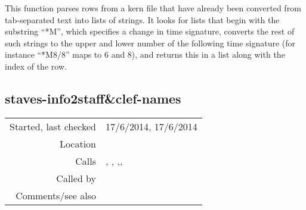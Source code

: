 \noindent This function parses rows from a kern file
that have already been converted from tab-separated
text into lists of strings. It looks for lists that
begin with the substring ``*M'', which specifies a
change in time signature, converts the rest of such
strings to the upper and lower number of the
following time signature (for instance ``*M8/8''
maps to 6 and 8), and returns this in a list along
with the index of the row.


\subsection*{staves-info2staff\&clef-names}\label{fun:staves-info2staff-n-clef-names}

\vspace{0.3cm}
\begin{tabular}{r|p{8cm}}
Started, last checked & 17/6/2014, 17/6/2014 \\
Location & \nameref{sec:kern-to-staff-features} \\
Calls & \nameref{fun:nth-list}, \nameref{fun:positions}, \nameref{fun:read-from-file-arbitrary},\newline \nameref{fun:replace-all}, \nameref{fun:tab-separated-string2list} \\
Called by & \nameref{fun:Stravinsqi-Jun2014} \\
Comments/see also &
\end{tabular}

